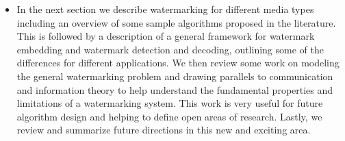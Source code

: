 \documentclass[12pt]{IEeetran}
\begin{document}
\begin{itemize}
\item In the next section we describe watermarking for different media types including an overview of some sample
algorithms proposed in the literature. This is followed by
a description of a general framework for watermark embedding and watermark detection and decoding, outlining some of the differences for different applications. We
then review some work on modeling the general
watermarking problem and drawing parallels to communication and information theory to help understand the
fundamental properties and limitations of a watermarking system. This work is very useful for future algorithm
design and helping to define open areas of research.
Lastly, we review and summarize future directions in this
new and exciting area.
\end{itemize}\\
\end{document}

